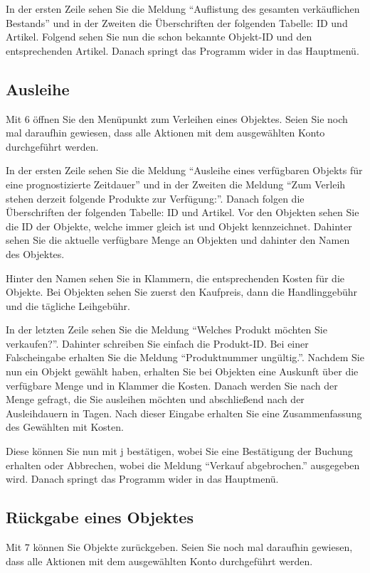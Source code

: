 \documentclass[a4paper,12pt,titlepage]{article}
\begin{document}
In der ersten Zeile sehen Sie die Meldung \enquote{Auflistung des gesamten verkäuflichen Bestands}
 und in der Zweiten die Überschriften der folgenden Tabelle: ID und Artikel.
Folgend sehen Sie nun die schon bekannte Objekt-ID und den entsprechenden Artikel.
Danach springt das Programm wider in das Hauptmenü.

\subsection{Ausleihe}
Mit 6 öffnen Sie den Menüpunkt zum Verleihen eines Objektes.
Seien Sie noch mal daraufhin gewiesen, dass alle Aktionen mit dem ausgewählten Konto durchgeführt werden.

In der ersten Zeile sehen Sie die Meldung \enquote{Ausleihe eines verfügbaren Objekts für eine prognostizierte Zeitdauer}
 und in der Zweiten die Meldung \enquote{Zum Verleih stehen derzeit folgende Produkte zur Verfügung:}.
Danach folgen die Überschriften der folgenden Tabelle: ID und Artikel.
Vor den Objekten sehen Sie die ID der Objekte, welche immer gleich ist und Objekt kennzeichnet. 
Dahinter sehen Sie die aktuelle verfügbare Menge an Objekten und dahinter den Namen des Objektes.

Hinter den Namen sehen Sie in Klammern, die entsprechenden Kosten für die Objekte.
Bei Objekten sehen Sie zuerst den Kaufpreis, dann die Handlinggebühr und die tägliche Leihgebühr.

In der letzten Zeile sehen Sie die Meldung \enquote{Welches Produkt möchten Sie verkaufen?}.
Dahinter schreiben Sie einfach die Produkt-ID.
Bei einer Falscheingabe erhalten Sie die Meldung \enquote{Produktnummer ungültig.}.
Nachdem Sie nun ein Objekt gewählt haben,
 erhalten Sie bei Objekten eine Auskunft über die verfügbare Menge und in Klammer die Kosten.
Danach werden Sie nach der Menge gefragt, die Sie ausleihen möchten und abschließend nach der Ausleihdauern in Tagen.
Nach dieser Eingabe erhalten Sie eine Zusammenfassung des Gewählten mit Kosten.

Diese können Sie nun mit j bestätigen, wobei Sie eine Bestätigung der Buchung erhalten oder Abbrechen,
 wobei die Meldung \enquote{Verkauf abgebrochen.} ausgegeben wird.
Danach springt das Programm wider in das Hauptmenü.
\subsection{Rückgabe eines Objektes}
Mit 7 können Sie Objekte zurückgeben.
Seien Sie noch mal daraufhin gewiesen, dass alle Aktionen mit dem ausgewählten Konto durchgeführt werden.
\end{document}
